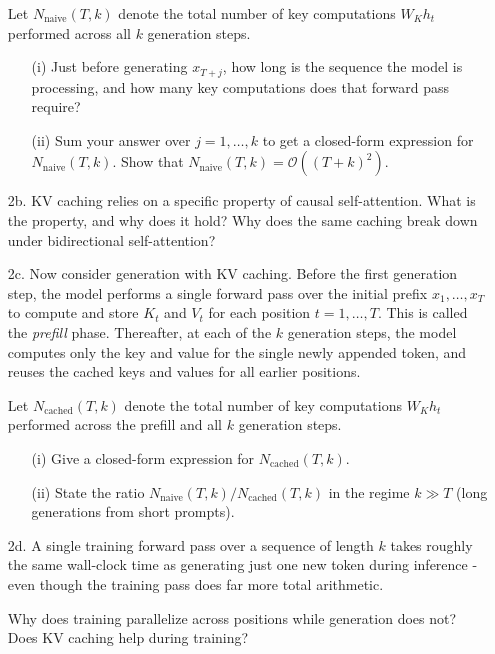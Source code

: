 \documentclass[submit]{../harvardml}
\begin{document}
\begin{framed}
\begin{enumerate}
  Let $N_{\text{naive}}(T, k)$ denote the total number of key computations $W_K h_t$ performed across all $k$ generation steps.
  
  \begin{enumerate}
    \item[(i)] Just before generating $x_{T+j}$, how long is the sequence the model is processing, and how many key computations does that forward pass require?
    \item[(ii)] Sum your answer over $j = 1, \ldots, k$ to get a closed-form expression for $N_{\text{naive}}(T, k)$. Show that $N_{\text{naive}}(T, k) = \mathcal{O}((T+k)^2)$.
  \end{enumerate}
  
  \item[2b.] KV caching relies on a specific property of causal self-attention. What is the property, and why does it hold? Why does the same caching break down under bidirectional self-attention?
  
  \item[2c.] Now consider generation with KV caching. Before the first generation step, the model performs a single forward pass over the initial prefix $x_1, \ldots, x_T$ to compute and store $K_t$ and $V_t$ for each position $t = 1, \ldots, T$. This is called the \emph{prefill} phase. Thereafter, at each of the $k$ generation steps, the model computes only the key and value for the single newly appended token, and reuses the cached keys and values for all earlier positions.
  
  Let $N_{\text{cached}}(T, k)$ denote the total number of key computations $W_K h_t$ performed across the prefill and all $k$ generation steps.
  
  \begin{enumerate}
    \item[(i)] Give a closed-form expression for $N_{\text{cached}}(T, k)$.
    \item[(ii)] State the ratio $N_{\text{naive}}(T, k) / N_{\text{cached}}(T, k)$ in the regime $k \gg T$ (long generations from short prompts).
  \end{enumerate}
  
  \item[2d.] A single training forward pass over a sequence of length $k$ takes roughly the same wall-clock time as generating just one new token during inference - even though the training pass does far more total arithmetic.
  
  Why does training parallelize across positions while generation does not? Does KV caching help during training?
\end{enumerate}
\end{framed}
\end{document}
